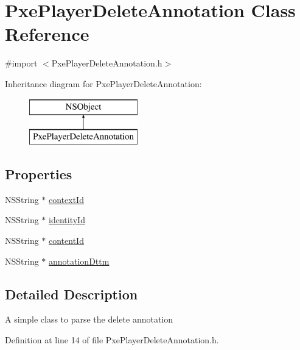 \hypertarget{interface_pxe_player_delete_annotation}{\section{Pxe\-Player\-Delete\-Annotation Class Reference}
\label{interface_pxe_player_delete_annotation}
}


{\ttfamily \#import $<$Pxe\-Player\-Delete\-Annotation.\-h$>$}

Inheritance diagram for Pxe\-Player\-Delete\-Annotation\-:\begin{figure}[H]
\begin{center}
\leavevmode
\includegraphics[height=2.000000cm]{interface_pxe_player_delete_annotation}
\end{center}
\end{figure}
\subsection*{Properties}
\begin{DoxyCompactItemize}
\item 
N\-S\-String $\ast$ \hyperlink{interface_pxe_player_delete_annotation_af7e0af27ae414509ba43e44ddf7667a2}{context\-Id}
\item 
N\-S\-String $\ast$ \hyperlink{interface_pxe_player_delete_annotation_a97bf44541b15e60e18679e5fd9485183}{identity\-Id}
\item 
N\-S\-String $\ast$ \hyperlink{interface_pxe_player_delete_annotation_a370a323136369e89ce703c8811a87a3c}{content\-Id}
\item 
N\-S\-String $\ast$ \hyperlink{interface_pxe_player_delete_annotation_a929f2f2c876d9d89cda682c8a4e3f3da}{annotation\-Dttm}
\end{DoxyCompactItemize}


\subsection{Detailed Description}
A simple class to parse the delete annotation 

Definition at line 14 of file Pxe\-Player\-Delete\-Annotation.\-h.




